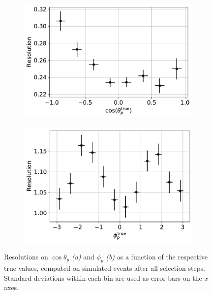 \begin{figure}[t]
	\centering
	\begin{subfigure}{.45\textwidth}
		\includegraphics[height=.2\textheight]{graphics/05-angular_distributions/MCRECO_p_theta_resolution.pdf}
		\caption{}
		\label{fig:5:MCRECO_p_theta_resolution}
	\end{subfigure}
	\begin{subfigure}{.45\textwidth}
		\includegraphics[height=.2\textheight]{graphics/05-angular_distributions/MCRECO_p_phi_resolution.pdf}
		\caption{}
		\label{fig:5:MCRECO_p_phi_resolution}
	\end{subfigure}
	\caption{Resolutions on $\cos\theta_p$ \textit{(a)} and $\phi_p$ \textit{(b)} as a function of the respective true values, computed on simulated \demonstratorshort events after all selection steps. Standard deviations within each bin are used as error bars on the $x$ axes.}
	\label{fig:5:angular_resolutions}
\end{figure}

